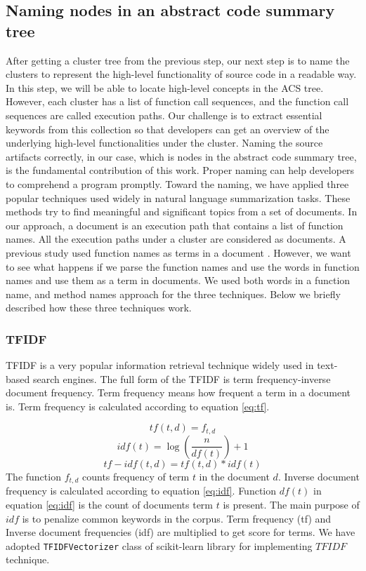 \subsection{Naming nodes in an abstract code summary tree}
\label{hla1:node_title}
After getting a cluster tree from the previous step, our next step is to name the clusters to represent the high-level functionality of source code in a readable way. In this step, we will be able to locate high-level concepts in the ACS tree. However, each cluster has a list of function call sequences, and the function call sequences are called execution paths. Our challenge is to extract essential keywords from this collection so that developers can get an overview of the underlying high-level functionalities under the cluster. Naming the source artifacts correctly, in our case, which is nodes in the abstract code summary tree, is the fundamental contribution of this work. Proper naming can help developers to comprehend a program promptly. Toward the naming, we have applied three popular techniques used widely in natural language summarization tasks. These methods try to find meaningful and significant topics from a set of documents. In our approach, a document is an execution path that contains a list of function names. All the execution paths under a cluster are considered as documents.
A previous study used function names as terms in a document \cite{gharibi2018automaticStaticCluster}. However, we want to see what happens if we parse the function names and use the words in function names and use them as a term in documents. We used both words in a function name, and method names approach for the three techniques. Below we briefly described how these three techniques work. 

\subsubsection{TFIDF}
TFIDF \cite{ramos2003usingTfidfRelevance} is a very popular information retrieval technique widely used in text-based search engines. The full form of the TFIDF is term frequency-inverse document frequency. Term frequency means how frequent a term in a document is. Term frequency is calculated according to equation \ref{eq:tf}.

\begin{equation}
    tf(t,d) = f_{t,d}
    \label{eq:tf}
\end{equation}
\begin{equation}
    idf(t) = \log(\frac{n}{df(t)})+1
    \label{eq:idf}
\end{equation}
\begin{equation}
    tf-idf(t,d) = tf(t,d) * idf(t)
    \label{eq:TFIDF}
\end{equation}
The function $f_{t,d}$ counts frequency of term $t$ in the document $d$. Inverse document frequency is calculated according to equation \ref{eq:idf}. Function $df(t)$ in equation \ref{eq:idf} is the count of documents term $t$ is present. The main purpose of $idf$ is to penalize common keywords in the corpus. Term frequency (tf) and Inverse document frequencies (idf) are multiplied to get score for terms. We have adopted \texttt{TFIDFVectorizer} class of scikit-learn \cite{scikit-learn} library for implementing $TFIDF$ technique.
